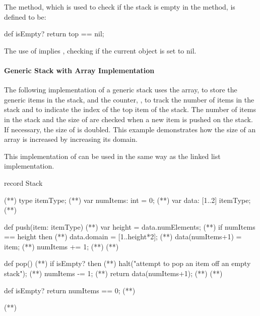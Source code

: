 The  method, which is used to check if the stack
is empty in the  method, is defined to be:
\begin{chapel}
  def isEmpty? return top == nil;   
\end{chapel}
The use of  implies , checking if the
current  object is set to nil.

\paragraph{Generic Stack with Array Implementation}
The following implementation of a generic stack uses the array,
 to store the generic items in the stack, and the
counter, , to track the
number of items in the stack and to indicate the index of
the top item of the stack.  The number of items in the stack
and the size of  are checked when a new item is pushed
on the stack.  If necessary, the size of  is doubled.
This example demonstrates how the size of an array is increased 
by increasing its domain.

This implementation of  can be used in the same
way as the linked list implementation.

\begin{numberedchapel}
record Stack {                     (*\label{stack_array_start}*)
  type itemType;                   (*\label{stack_array_itemtype}*)
  var numItems: int = 0;           (*\label{stack_array_numitems}*)
  var data: [1..2] itemType;       (*\label{stack_array_data}*)

  def push(item: itemType) {       (*\label{stack_array_push_start}*)
    var height = data.numElements;  (*\label{stack_array_push_height}*)
    if numItems == height then      (*\label{stack_array_push_check_height}*)
      data.domain = [1..height*2];  (*\label{stack_array_push_incr_dom}*)
    data(numItems+1) = item;        (*\label{stack_array_push_new_item}*)
    numItems += 1;                  (*\label{stack_array_push_num_incr}*)
  }                                 (*\label{stack_array_push_end}*)

  def pop() {                       (*\label{stack_array_pop_start}*)
    if isEmpty? then                (*\label{stack_array_pop_empty_1}*)
      halt("attempt to pop an item off an empty stack"); (*\label{stack_array_pop_empty_2}*)
    numItems -= 1;                  (*\label{stack_array_pop_num_dec}*)
    return data(numItems+1);        (*\label{stack_array_pop_return}*)
  }                                 (*\label{stack_array_pop_end}*)

  def isEmpty? return numItems == 0; (*\label{stack_array_isempty}*)
}                                   (*\label{stack_array_end}*)
\end{numberedchapel}

